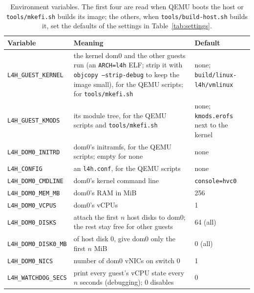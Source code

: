 \documentclass[11pt,a4paper]{report}
\newcommand{\cmd}[1]{\texttt{#1}}
\newcommand{\file}[1]{\texttt{#1}}
\begin{document}
\begin{table}[ht]
\centering
\begin{tabularx}{\linewidth}{@{}lXl@{}}
\toprule
Variable & Meaning & Default \\
\midrule
\texttt{L4H\_GUEST\_KERNEL} & the kernel dom0 and the other guests run (an
  \texttt{ARCH=l4h} ELF; strip it with \cmd{objcopy --strip-debug} to keep
  the image small), for the QEMU scripts; for \cmd{tools/mkefi.sh} &
  none; \file{build/linux-l4h/vmlinux} \\
\texttt{L4H\_GUEST\_KMODS} & its module tree, for the QEMU scripts and
  \cmd{tools/mkefi.sh} & none; \file{kmods.erofs} next to the kernel \\
\texttt{L4H\_DOM0\_INITRD} & dom0's initramfs, for the QEMU scripts; empty
  for none & none \\
\texttt{L4H\_CONFIG} & an \file{l4h.conf}, for the QEMU scripts & none \\
\texttt{L4H\_DOM0\_CMDLINE} & dom0's kernel command line & \texttt{console=hvc0} \\
\texttt{L4H\_DOM0\_MEM\_MB} & dom0's RAM in MiB & 256 \\
\texttt{L4H\_DOM0\_VCPUS} & dom0's vCPUs & 1 \\
\texttt{L4H\_DOM0\_DISKS} & attach the first $n$ host disks to dom0; the rest stay
  free for other guests & 64 (all) \\
\texttt{L4H\_DOM0\_DISK0\_MB} & of host disk 0, give dom0 only the first $n$ MiB &
  0 (all) \\
\texttt{L4H\_DOM0\_NICS} & number of dom0 vNICs on switch 0 & 1 \\
\texttt{L4H\_WATCHDOG\_SECS} & print every guest's vCPU state every $n$ seconds
  (debugging); 0 disables & 0 \\
\bottomrule
\end{tabularx}
\caption{Environment variables. The first four are read when QEMU
  boots the host or \cmd{tools/mkefi.sh} builds its image; the others, when \cmd{tools/build-host.sh} builds it, set
  the defaults of the settings in Table~\ref{tab:settings}.}
\label{tab:env}
\end{table}
\end{document}

